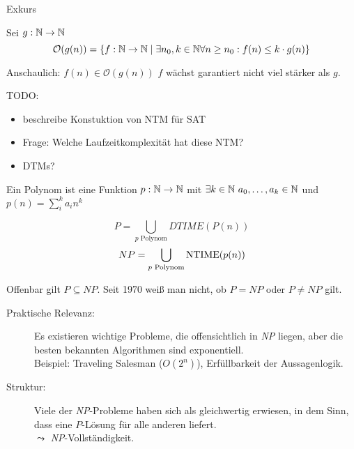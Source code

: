 {\color{red}


Exkurs
\begin{Def} Sei $g:\mathbb{N}\rightarrow\mathbb{N}$
$$\mathcal{O}(g(n)) = \{f:\mathbb{N}\rightarrow\mathbb{N} \mid \exists n_0, k\in\mathbb{N} \forall n\geq n_0: f(n)\leq k\cdot g(n)\}$$
\end{Def}

Anschaulich: $f(n)\in \mathcal{O}(g(n))$ $f$ wächst garantiert nicht viel stärker als $g$.


TODO: 

\begin{itemize}
 \item beschreibe Konstuktion von NTM für SAT
 \item Frage: Welche Laufzeitkomplexität hat diese NTM?
 \item DTMs?
\end{itemize}


\bigskip

\begin{Def}[name={[Polynom]}]
	Ein Polynom ist eine Funktion $p:\N\->\N$ mit $\exists k\in \mathbb{N}\ a_0,\dots,a_k\in\mathbb{N}$ und \mbox{$p(n)=\sum_i^k a_in^k$}
\end{Def}
\begin{Def}
 \[ P = \bigcup_{p\text{ Polynom}} DTIME(P(n)) \]
 \[ NP = \bigcup_{p\text{ Polynom}} \operatorname{NTIME}(p(n)) \]
 
\end{Def}



Offenbar gilt $P\subseteq \textit{NP}$. Seit 1970 weiß man nicht, ob $P=\textit{NP}$ oder $P\neq \textit{NP}$ gilt.
\begin{description}
\item[Praktische Relevanz:] Es existieren wichtige Probleme, die offensichtlich in \textit{NP} liegen, aber die besten bekannten Algorithmen sind exponentiell.\\
	Beispiel: Traveling Salesman ($O(2^n)$), Erfüllbarkeit der Aussagenlogik.
\item[Struktur:] Viele der \textit{NP}-Probleme haben sich als gleichwertig erwiesen, in dem Sinn, dass eine $P$-Lösung für alle anderen liefert.\\
	$\leadsto$ \textit{NP}-Vollständigkeit.
\end{description}
}

